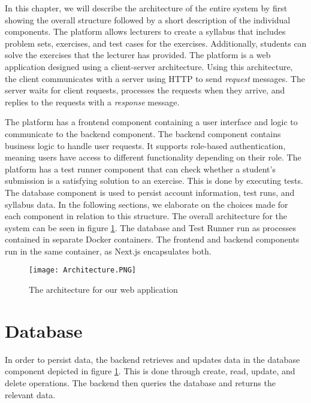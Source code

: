 In this chapter, we will describe the architecture of the entire system by first showing the overall structure followed by a short description of the individual components.
The platform allows lecturers to create a syllabus that includes problem sets, exercises, and test cases for the exercises. Additionally, students can solve the exercises that the lecturer has provided.
The platform is a web application designed using a client-server architecture. Using this architecture, the client communicates with a server using HTTP to send \textit{request} messages. The server waits for client requests, processes the requests when they arrive, and replies to the requests with a \textit{response} message.

The platform has a frontend component containing a user interface and logic to communicate to the backend component.
The backend component contains business logic to handle user requests.
It supports role-based authentication, meaning users have access to different functionality depending on their role.
The platform has a test runner component that can check whether a student's submission is a satisfying solution to an exercise.
This is done by executing tests. The database component is used to persist account information, test runs, and syllabus data.
In the following sections, we elaborate on the choices made for each component in relation to this structure.
The overall architecture for the system can be seen in figure \ref{fig:Architecture}.
The database and Test Runner run as processes contained in separate Docker containers. The frontend and backend components run in the same container, as Next.js encapsulates both.

\begin{figure}[H]
	\texttt{[image: Architecture.PNG]}
	\centering
	\caption{The architecture for our web application}
	\label{fig:Architecture}
\end{figure}


\section{Database}
In order to persist data, the backend retrieves and updates data in the database component depicted in figure \ref{fig:Architecture}. This is done through create, read, update, and delete operations.
The backend then queries the database and returns the relevant data.

